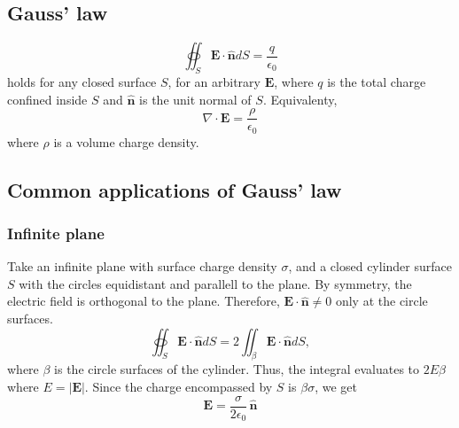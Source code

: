 \documentclass[a4paper, 12pt]{article}
\renewcommand{\vec}[1]{\mathbf{#1}}
\newcommand{\E}{\ensuremath{\vec{E}}}
\newcommand{\e}{\ensuremath{\epsilon_0}}
\let\tmp\hat
\renewcommand{\hat}[1]{\vec{\tmp{#1}}}
\begin{document}
\subsection{Gauss' law}
    \begin{equation}
        \oiint_S \E\cdot\hat{n}dS = \frac{q}{\e}
    \end{equation}
    holds for any closed surface $S$, for an arbitrary $\E$, 
    where $q$ is the total charge confined inside $S$ and $\hat{n}$ is the unit normal of $S$. Equivalenty, 
    \begin{equation}
        \nabla \cdot \E = \frac{\rho}{\e}
    \end{equation}
    where $\rho$ is a volume charge density. 

\subsection{Common applications of Gauss' law}
    \subsubsection{Infinite plane}
        Take an infinite plane with surface charge density $\sigma$, 
        and a closed cylinder surface $S$ with the circles equidistant and parallell to the plane. 
        By symmetry, the electric field is orthogonal to the plane. Therefore, $\E\cdot\hat{n} \neq 0$ only at the circle surfaces. 
        \begin{equation*}
            \oiint_S \E\cdot\hat{n}dS = 2\iint_\beta \E\cdot\hat{n}dS,
        \end{equation*}
        where $\beta$ is the circle surfaces of the cylinder. Thus, the integral evaluates to $2E\beta$ where $E = |\E|$. 
        Since the charge encompassed by $S$ is $\beta\sigma$, we get
        \begin{equation}
            \E = \frac{\sigma}{2\e}\,\hat{n}
        \end{equation}
\end{document}
